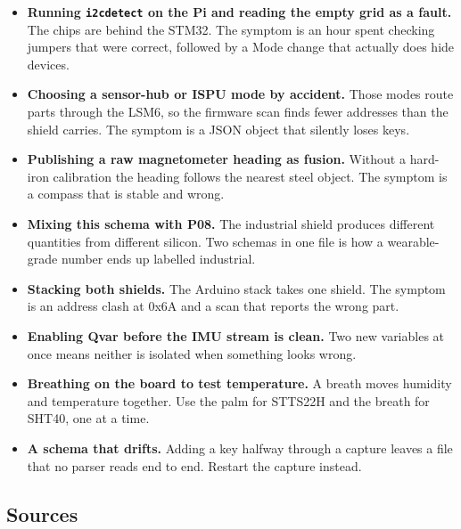 \begin{itemize}
\item \textbf{Running \texttt{i2cdetect} on the Pi and reading the empty grid as a fault.}
The chips are behind the STM32. The symptom is an hour spent checking jumpers that were
correct, followed by a Mode change that actually does hide devices.
\item \textbf{Choosing a sensor-hub or ISPU mode by accident.} Those modes route parts
through the LSM6, so the firmware scan finds fewer addresses than the shield carries. The
symptom is a JSON object that silently loses keys.
\item \textbf{Publishing a raw magnetometer heading as fusion.} Without a hard-iron
calibration the heading follows the nearest steel object. The symptom is a compass that is
stable and wrong.
\item \textbf{Mixing this schema with P08.} The industrial shield produces different
quantities from different silicon. Two schemas in one file is how a wearable-grade number
ends up labelled industrial.
\item \textbf{Stacking both shields.} The Arduino stack takes one shield. The symptom is an
address clash at 0x6A and a scan that reports the wrong part.
\item \textbf{Enabling Qvar before the IMU stream is clean.} Two new variables at once
means neither is isolated when something looks wrong.
\item \textbf{Breathing on the board to test temperature.} A breath moves humidity and
temperature together. Use the palm for STTS22H and the breath for SHT40, one at a time.
\item \textbf{A schema that drifts.} Adding a key halfway through a capture leaves a file
that no parser reads end to end. Restart the capture instead.
\end{itemize}

\subsection*{Sources}

